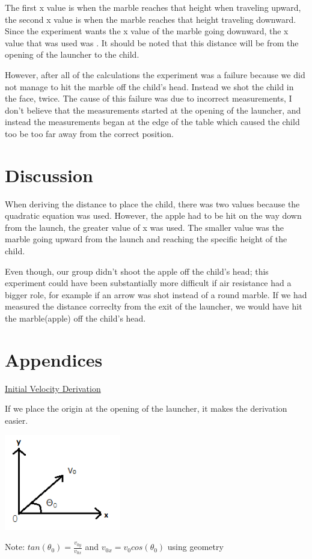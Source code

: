 \documentclass[aps,letterpaper,11pt]{revtex4}
\begin{document}
The first x value is when the marble reaches that height when traveling upward, the second x value is when the marble reaches that height traveling downward. Since the experiment wants the x value of the marble going downward, the x value that was used was . It should be noted that this distance will be from the opening of the launcher to the child. 

However, after all of the calculations the experiment was a failure because we did not manage to hit the marble off the child's head. Instead we shot the child in the face, twice. The cause of this failure was due to incorrect measurements, I don't believe that the measurements started at the opening of the launcher, and instead the measurements began at the edge of the table which caused the child too be too far away from the correct position. 

\section{Discussion} 

 When deriving the distance to place the child, there was two values because the quadratic equation was used. However, the apple had to be hit on the way down from the launch, the greater value of x was used. The smaller value was the marble going upward from the launch and reaching the specific height of the child. 
 
 Even though, our group didn't shoot the apple off the child's head; this experiment could have been substantially more difficult if air resistance had a bigger role, for example if an arrow was shot instead of a round marble. If we had measured the distance correclty from the exit of the launcher, we would have hit the marble(apple) off the child's head.

\section{Appendices}

\underline{Initial Velocity Derivation}

If we place the origin at the opening of the launcher, it makes the derivation easier.\\

\begin{center}
\includegraphics[width=2in]{VNAUGHTGRAPH.png}

Note: $tan(\theta_0) = \frac{v_{0y}}{v_{0x}}$ and $v_{0x}=v_0cos(\theta_0)$ using geometry

\end{center}
\end{document}
